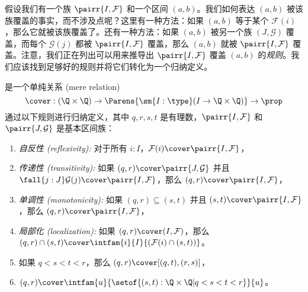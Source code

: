 
假设我们有一个族 $\pairr{I, \mathcal{F}}$ 和一个区间 $(a, b)$。我们如何表达 $(a,b)$ 被该族覆盖的事实，而不涉及点呢？这里有一种方法：如果 $(a, b)$ 等于某个 $\mathcal{F}(i)$，那么它就被该族覆盖了。还有一种方法：如果 $(a,b)$ 被另一个族 $(J, \mathcal{G})$ 覆盖，而每个 $\mathcal{G}(j)$ 都被 $\pairr{I, \mathcal{F}}$ 覆盖，那么 $(a,b)$ 就被 $\pairr{I, \mathcal{F}}$ 覆盖。注意，我们正在列出可以用来推导出 $\pairr{I, \mathcal{F}}$ 覆盖 $(a,b)$ 的\emph{规则}。我们应该找到足够好的规则并将它们转化为一个归纳定义。

\begin{defn} \label{defn:inductive-cover}
%
%
是一个单纯关系 (mere relation)
%
\begin{equation*}
{\cover} : (\Q \times \Q) \to \Parens{\sm{I : \type} (I \to \Q \times \Q)} \to \prop
\end{equation*}
%
通过以下规则进行归纳定义，其中 $q, r, s, t$ 是有理数，$\pairr{I, \mathcal{F}}$ 和 $\pairr{J, \mathcal{G}}$ 是基本区间族：
%
\begin{enumerate}

  \item \emph{自反性 (reflexivity):}%
  对于所有 $i : I$，$\mathcal{F}(i) \cover \pairr{I, \mathcal{F}}$，

  \item \emph{传递性 (transitivity):}%
  如果 $(q, r) \cover \pairr{J, \mathcal{G}}$ 并且 $\fall{j : J} \mathcal{G}(j) \cover \pairr{I,\mathcal{F}}$，那么 $(q, r) \cover \pairr{I, \mathcal{F}}$，

  \item \emph{单调性 (monotonicity):}%
  如果 $(q, r) \subseteq (s, t)$ 并且 $(s,t) \cover \pairr{I, \mathcal{F}}$，那么 $(q, r) \cover \pairr{I, \mathcal{F}}$，

  \item \emph{局部化 (localization):}%
  如果 $(q, r) \cover (I, \mathcal{F})$，那么 $(q, r) \cap (s, t) \cover \intfam{i}{I}{(\mathcal{F}(i) \cap (s, t))}$。

  \item \label{defn:inductive-cover-interval-1}
  如果 $q < s < t < r$，那么 $(q, r) \cover [(q, t), (r, s)]$，

  \item \label{defn:inductive-cover-interval-2}
  $(q, r) \cover \intfam{u}{\setof{ (s,t) : \Q \times \Q | q < s < t < r}}{u}$。
\end{enumerate}
\end{defn}

